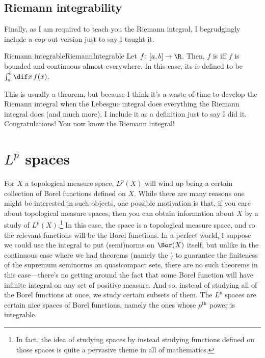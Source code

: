 \subsection{Riemann integrability}

Finally, as I am required to teach you the Riemann integral, I begrudgingly include a cop-out version just to say I taught it.
\begin{dfn}{Riemann integrable}{RiemannIntegrable}
Let $f\colon [a,b]\rightarrow \R$.  Then, $f$ is  iff $f$ is bounded and continuous almost-everywhere.  In this case, its  is defined to be $\int _a^b\dif x\, f(x)$.
\begin{rmk}
This is usually a theorem, but because I think it's a waste of time to develop the Riemann integral when the Lebesgue integral does everything the Riemann integral does (and much more), I include it as a definition just to say I did it.  Congratulations!  You now know the Riemann integral!
\end{rmk}
\end{dfn}

\section{\texorpdfstring{$L^p$}{Lp} spaces}\label{Lp}

For $X$ a topological measure space, $L^p(X)$ will wind up being a certain collection of Borel functions defined on $X$.  While there are many reasons one might be interested in such objects, one possible motivation is that, if you care about topological measure spaces, then you can obtain information about $X$ by a study of $L^p(X)$.\footnote{In fact, the idea of studying spaces by instead studying functions defined on those spaces is quite a pervasive theme in all of mathematics.} In this case, the space is a topological measure space, and so the relevant functions will be the Borel functions.  In a perfect world, I suppose we could use the integral to put (semi)norms on $\Bor (X)$ itself, but unlike in the continuous case where we had theorems (namely the ) to guarantee the finiteness of the supremum seminorms on quasicompact sets, there are no such theorems in this case---there's no getting around the fact that some Borel function will have infinite integral on any set of positive measure.  And so, instead of studying all of the Borel functions at once, we study certain subsets of them.  The $L^p$ spaces are certain nice spaces of Borel functions, namely the ones whose $p^{\text{th}}$ power is integrable.

